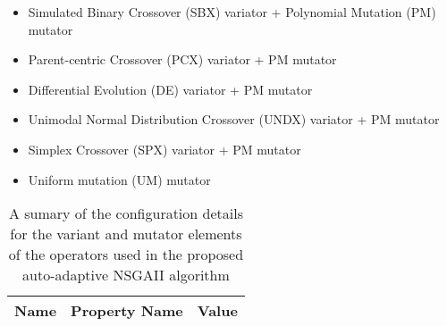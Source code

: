     \begin{itemize}
        \item Simulated Binary Crossover (SBX) variator + Polynomial Mutation (PM) mutator
        \item Parent-centric Crossover (PCX) variator + PM mutator
        \item Differential Evolution (DE) variator + PM mutator
        \item Unimodal Normal Distribution Crossover (UNDX) variator + PM mutator
        \item Simplex Crossover (SPX) variator + PM mutator
        \item Uniform mutation (UM) mutator
    \end{itemize}

    \begin{table}[ht]
        \centering
        \captionsetup{width=0.57\textwidth}
        \caption[Auto-adaptive $\epsilon$-NSGAII configuration]{A sumary of the configuration details for the variant and mutator elements of the operators used in the proposed auto-adaptive NSGAII algorithm \citep{HadkaReed2013}}
        \label{table:nsgaii-hybrid}
        
        \setlength\arrayrulewidth{1pt}
        \begin{tabularx}{0.55\textwidth}{|l|X|r|}
            \rowcolor{tudelft-dark-blue!80}
            \color{white}\bfseries Name      &   \color{white}\bfseries Property Name   &   
            \multicolumn{1}{|l|}{\color{white}\bfseries Value} \\ \hline
            

\end{tabularx}
\end{table}
